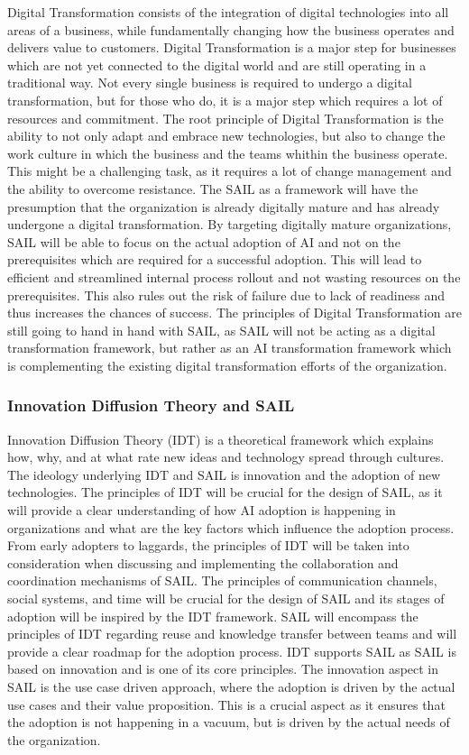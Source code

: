 \documentclass[]{imc-inf}
\begin{document}
Digital Transformation consists of the integration of digital
technologies into all areas of a business, while fundamentally changing
how the business operates and delivers value to customers. Digital
Transformation is a major step for businesses which are not yet
connected to the digital world and are still operating in a traditional
way. Not every single business is required to undergo a digital
transformation, but for those who do, it is a major step which requires
a lot of resources and commitment. The root principle of Digital
Transformation is the ability to not only adapt and embrace new
technologies, but also to change the work culture in which the business
and the teams whithin the business operate. This might be a challenging
task, as it requires a lot of change management and the ability to
overcome resistance. The SAIL as a framework will have the presumption
that the organization is already digitally mature and has already
undergone a digital transformation. By targeting digitally mature
organizations, SAIL will be able to focus on the actual adoption of AI
and not on the prerequisites which are required for a successful
adoption. This will lead to efficient and streamlined internal process
rollout and not wasting resources on the prerequisites. This also rules
out the risk of failure due to lack of readiness and thus increases the
chances of success. The principles of Digital Transformation are still
going to hand in hand with SAIL, as SAIL will not be acting as a digital
transformation framework, but rather as an AI transformation framework
which is complementing the existing digital transformation efforts of
the organization.

\subsubsection{Innovation Diffusion Theory and
	SAIL}\label{innovation-diffusion-theory-and-sail}

Innovation Diffusion Theory (IDT) is a theoretical framework which
explains how, why, and at what rate new ideas and technology spread
through cultures. The ideology underlying IDT and SAIL is innovation and
the adoption of new technologies. The principles of IDT will be crucial
for the design of SAIL, as it will provide a clear understanding of how
AI adoption is happening in organizations and what are the key factors
which influence the adoption process. From early adopters to laggards,
the principles of IDT will be taken into consideration when discussing
and implementing the collaboration and coordination mechanisms of SAIL.
The principles of communication channels, social systems, and time will
be crucial for the design of SAIL and its stages of adoption will be
inspired by the IDT framework. SAIL will encompass the principles of IDT
regarding reuse and knowledge transfer between teams and will provide a
clear roadmap for the adoption process. IDT supports SAIL as SAIL is
based on innovation and is one of its core principles. The innovation
aspect in SAIL is the use case driven approach, where the adoption is
driven by the actual use cases and their value proposition. This is a
crucial aspect as it ensures that the adoption is not happening in a
vacuum, but is driven by the actual needs of the organization.
\end{document}
